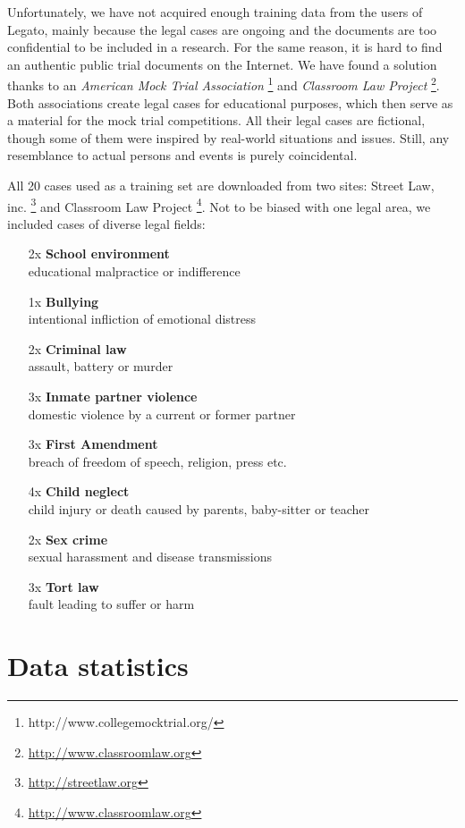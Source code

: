 \documentclass[
  digital, %
  table,   %
  lof,     %
  lot,     %
]{fithesis3}
\begin{document}
Unfortunately, we have not acquired enough training data from the users of Legato, mainly because the legal cases are ongoing and the documents are too confidential to be included in a research.
For the same reason, it is hard to find an authentic public trial documents on the Internet.
We have found a solution thanks to an \textit{American Mock Trial Association} \footnote{http://www.collegemocktrial.org/} and \textit{Classroom Law Project} \footnote{\url{http://www.classroomlaw.org}}.
Both associations create legal cases for educational purposes, which then serve as a material for the mock trial competitions.
All their legal cases are fictional, though some of them were inspired by real-world situations and issues.
Still, any resemblance to actual persons and events is purely coincidental.

All 20 cases used as a training set are downloaded from two sites: Street Law, inc. \footnote{\url{http://streetlaw.org}} and Classroom Law Project \footnote{\url{http://www.classroomlaw.org}}.
Not to be biased with one legal area, we included cases of diverse legal fields:
\begin{itemize}
\item[2x] \textbf{School environment} \\ educational malpractice or indifference
\item[1x] \textbf{Bullying} \\ intentional infliction of emotional distress
\item[2x] \textbf{Criminal law} \\ assault, battery or murder
\item[3x] \textbf{Inmate partner violence} \\ domestic violence by a current or former partner
\item[3x] \textbf{First Amendment} \\ breach of freedom of speech, religion, press etc.
\item[4x] \textbf{Child neglect} \\ child injury or death caused by parents, baby-sitter or teacher
\item[2x] \textbf{Sex crime} \\ sexual harassment and disease transmissions
\item[3x] \textbf{Tort law } \\ fault leading to suffer or harm
\end{itemize}


\section{Data statistics}
\end{document}
